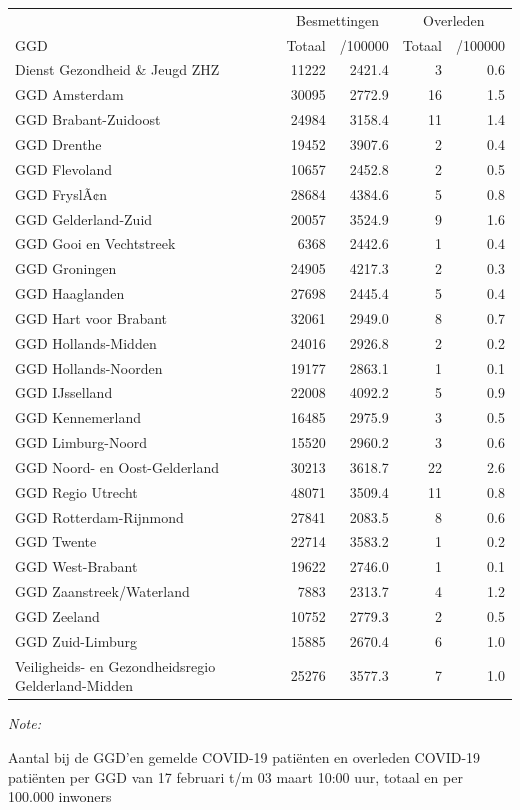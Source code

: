 \documentclass[
  english,
  man,floatsintext]{apa6}
\begin{document}
\begin{table}
\centering\begingroup\fontsize{10}{12}\selectfont

\begin{threeparttable}
\begin{tabular}{lrrrr}
\toprule
\multicolumn{1}{c}{ } & \multicolumn{2}{c}{Besmettingen} & \multicolumn{2}{c}{Overleden} \\
\cmidrule(l{3pt}r{3pt}){2-3} \cmidrule(l{3pt}r{3pt}){4-5}
GGD & Totaal & /100000 & Totaal & /100000\\
\midrule
Dienst Gezondheid \& Jeugd ZHZ & 11222 & 2421.4 & 3 & 0.6\\
GGD Amsterdam & 30095 & 2772.9 & 16 & 1.5\\
GGD Brabant-Zuidoost & 24984 & 3158.4 & 11 & 1.4\\
GGD Drenthe & 19452 & 3907.6 & 2 & 0.4\\
GGD Flevoland & 10657 & 2452.8 & 2 & 0.5\\
GGD FryslÃ¢n & 28684 & 4384.6 & 5 & 0.8\\
GGD Gelderland-Zuid & 20057 & 3524.9 & 9 & 1.6\\
GGD Gooi en Vechtstreek & 6368 & 2442.6 & 1 & 0.4\\
GGD Groningen & 24905 & 4217.3 & 2 & 0.3\\
GGD Haaglanden & 27698 & 2445.4 & 5 & 0.4\\
GGD Hart voor Brabant & 32061 & 2949.0 & 8 & 0.7\\
GGD Hollands-Midden & 24016 & 2926.8 & 2 & 0.2\\
GGD Hollands-Noorden & 19177 & 2863.1 & 1 & 0.1\\
GGD IJsselland & 22008 & 4092.2 & 5 & 0.9\\
GGD Kennemerland & 16485 & 2975.9 & 3 & 0.5\\
GGD Limburg-Noord & 15520 & 2960.2 & 3 & 0.6\\
GGD Noord- en Oost-Gelderland & 30213 & 3618.7 & 22 & 2.6\\
GGD Regio Utrecht & 48071 & 3509.4 & 11 & 0.8\\
GGD Rotterdam-Rijnmond & 27841 & 2083.5 & 8 & 0.6\\
GGD Twente & 22714 & 3583.2 & 1 & 0.2\\
GGD West-Brabant & 19622 & 2746.0 & 1 & 0.1\\
GGD Zaanstreek/Waterland & 7883 & 2313.7 & 4 & 1.2\\
GGD Zeeland & 10752 & 2779.3 & 2 & 0.5\\
GGD Zuid-Limburg & 15885 & 2670.4 & 6 & 1.0\\
Veiligheids- en Gezondheidsregio Gelderland-Midden & 25276 & 3577.3 & 7 & 1.0\\
\bottomrule
\end{tabular}
\begin{tablenotes}
\item \textit{Note: } 
\item Aantal bij de GGD’en gemelde COVID-19 patiënten en overleden COVID-19 patiënten per GGD van 17 februari t/m 03 maart 10:00 uur, totaal en per 100.000 inwoners
\end{tablenotes}
\end{threeparttable}
\endgroup{}
\end{table}
\end{document}
